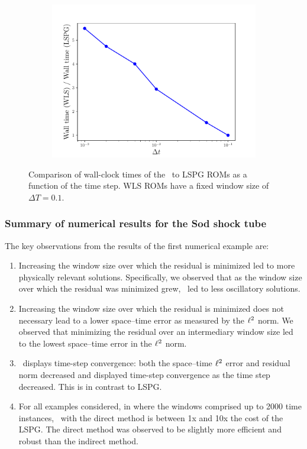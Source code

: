 \begin{figure}
\begin{center}
\begin{subfigure}[t]{0.45\textwidth}
\includegraphics[width=1.\linewidth]{figs/sod/walltime_vs_window_dtvar.pdf}
\label{fig:sod_error_a}
\end{subfigure}
\caption{Comparison of wall-clock times of the \methodAcronymROMs\ to LSPG ROMs as a function of the time step. WLS ROMs have a fixed window size of $\Delta T = 0.1$.} 
\label{fig:walltime_dtvar}
\end{center}
\end{figure}


\subsubsection{Summary of numerical results for the Sod shock tube}
The key observations from the results of the first numerical example are: 
\begin{enumerate}
\item Increasing the window size over which the residual is minimized led to more physically relevant solutions. Specifically, we observed that as the window size over which the residual was minimized grew, \methodAcronym\ led to less oscillatory solutions.
\item Increasing the window size over which the residual is minimized does not necessary lead to a lower space--time error as measured by the $\ell^2$ norm. We observed that minimizing the residual over an intermediary window size led to the lowest space--time error in the $\ell^2$ norm. 
\item \methodAcronym\ displays time-step convergence: both the space--time $\ell^2$ error and residual norm decreased and displayed time-step convergence as the time step decreased. This is in contrast to LSPG.
\item For all examples considered, in where the windows comprised up to 2000 time instances, \methodAcronym\ with the direct method is between 1x and 10x the cost of the LSPG. The 
direct method was observed to be slightly more efficient and robust than the indirect method.
\end{enumerate} 


